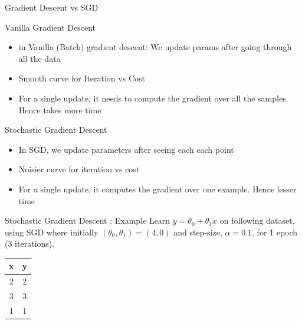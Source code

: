 \documentclass[usenames,dvipsnames]{beamer}
\begin{document}
                        
                        \begin{frame}{Gradient Descent vs SGD}
                    
                        
                        
                        
                        Vanilla Gradient Descent
                        \begin{itemize}[<+->]
                            \item 
                            in Vanilla (Batch) gradient descent: We update params after going through all the data 
                            \item Smooth curve for Iteration vs Cost
                            \item For a single update, it needs to compute the gradient over all the samples. Hence takes more time
                            
                        \end{itemize}
                        
                        \pause Stochastic Gradient Descent
                        \begin{itemize}[<+->]
                            \item In SGD, we update parameters after seeing each each point
                            \item Noisier curve for iteration vs cost 
                            \item  For a single update, it computes the gradient over one example. Hence lesser time
                        \end{itemize}
                        
                        
                    \end{frame}
                    
                    \begin{frame}{Stochastic Gradient Descent : Example}
                        Learn $y = \theta_0 + \theta_1 x$ on following dataset, using SGD where initially $(\theta_0, \theta_1) = (4,0)$ and step-size, $\alpha  = 0.1$, for 1 epoch (3 iterations). 
                        \begin{table}[]
                            \centering
                            \label{tab:my-table}
                            \begin{tabular}{|c|c|}
                                \hline
                                \textbf{x} & \textbf{y} \\ \hline
                                2 & 2 \\ \hline
                                3 & 3 \\ \hline
                                1 & 1 \\ \hline
                            \end{tabular}
                        \end{table}
                        \end{frame}
                        
\end{document}
